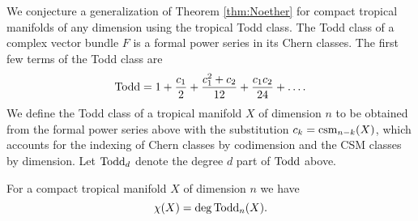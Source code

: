 We conjecture a generalization of Theorem \ref{thm:Noether} for compact tropical manifolds of any dimension using the tropical Todd class. 
The Todd class of a complex vector bundle $F$ is a formal power series in its Chern classes. The first few terms of the Todd class are 
\[ \operatorname{Todd} =  1 + \frac{c_1}{2} + \frac{c_1^2  + c_2}{12} + \frac{c_1c_2}{24} + \dots.\]
We define the Todd class of a tropical manifold $X$ of dimension $n$ to be obtained from the formal power series above with the substitution 
$c_k = \operatorname{csm}_{n-k}(X)$, which accounts for the indexing of Chern classes by codimension and the CSM classes by dimension. Let $\operatorname{Todd}_d$ denote the degree $d$ part of $\operatorname{Todd}$ above. 

\begin{conj}
For a compact tropical manifold $X$ of dimension $n$ we have 
$$\chi(X) = \deg \operatorname{Todd}_n(X). $$
\end{conj}

\vspace{2mm}